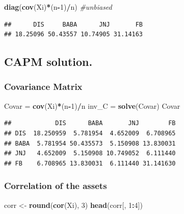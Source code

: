 \documentclass[]{article}
\newenvironment{Shaded}{\begin{snugshade}}{\end{snugshade}}
\newcommand{\KeywordTok}[1]{\textcolor[rgb]{0.13,0.29,0.53}{\textbf{#1}}}
\newcommand{\DecValTok}[1]{\textcolor[rgb]{0.00,0.00,0.81}{#1}}
\newcommand{\StringTok}[1]{\textcolor[rgb]{0.31,0.60,0.02}{#1}}
\newcommand{\CommentTok}[1]{\textcolor[rgb]{0.56,0.35,0.01}{\textit{#1}}}
\newcommand{\OperatorTok}[1]{\textcolor[rgb]{0.81,0.36,0.00}{\textbf{#1}}}
\newcommand{\NormalTok}[1]{#1}
\begin{document}
\begin{Shaded}
\begin{Highlighting}[]
\KeywordTok{diag}\NormalTok{(}\KeywordTok{cov}\NormalTok{(Xi)}\OperatorTok{*}\NormalTok{(n}\OperatorTok{-}\DecValTok{1}\NormalTok{)}\OperatorTok{/}\NormalTok{n) }\CommentTok{#unbiased}
\end{Highlighting}
\end{Shaded}

\begin{verbatim}
##      DIS     BABA      JNJ       FB 
## 18.25096 50.43557 10.74905 31.14163
\end{verbatim}

\subsection{CAPM solution.}\label{capm-solution.}

\subsubsection{Covariance Matrix}\label{covariance-matrix-1}

\begin{Shaded}
\begin{Highlighting}[]
\NormalTok{Covar =}\StringTok{ }\KeywordTok{cov}\NormalTok{(Xi)}\OperatorTok{*}\NormalTok{(n}\OperatorTok{-}\DecValTok{1}\NormalTok{)}\OperatorTok{/}\NormalTok{n}
\NormalTok{inv_C =}\StringTok{ }\KeywordTok{solve}\NormalTok{(Covar)}
\NormalTok{Covar}
\end{Highlighting}
\end{Shaded}

\begin{verbatim}
##            DIS      BABA       JNJ        FB
## DIS  18.250959  5.781954  4.652009  6.708965
## BABA  5.781954 50.435573  5.150908 13.830031
## JNJ   4.652009  5.150908 10.749052  6.111440
## FB    6.708965 13.830031  6.111440 31.141630
\end{verbatim}

\subsubsection{Correlation of the
assets}\label{correlation-of-the-assets}

\begin{Shaded}
\begin{Highlighting}[]
\NormalTok{corr <-}\StringTok{ }\KeywordTok{round}\NormalTok{(}\KeywordTok{cor}\NormalTok{(Xi), }\DecValTok{3}\NormalTok{)}
\KeywordTok{head}\NormalTok{(corr[, }\DecValTok{1}\OperatorTok{:}\DecValTok{4}\NormalTok{])}
\end{Highlighting}
\end{Shaded}
\end{document}
